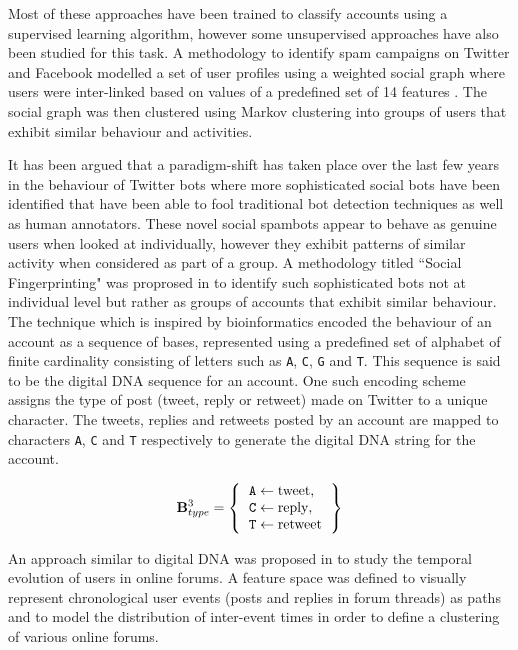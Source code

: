 \documentclass{llncs}
\begin{document}
Most of these approaches have been trained to classify accounts using a supervised learning algorithm, however some unsupervised approaches have also been studied for this task. A methodology to identify spam campaigns on Twitter and Facebook modelled a set of user profiles using a weighted social graph where users were inter-linked based on values of a predefined set of 14 features \cite{ahmed2013generic}. The social graph was then clustered using Markov clustering into groups of users that exhibit similar behaviour and activities.

It has been argued that a paradigm-shift \cite{Cresci:2017:PSS:3041021.3055135} has taken place over the last few years in the behaviour of Twitter bots where more sophisticated social bots have been identified that have been able to fool traditional bot detection techniques as well as human annotators. These novel social spambots appear to behave as genuine users when looked at individually, however they exhibit patterns of similar activity when considered as part of a group. A methodology titled ``Social Fingerprinting" was proprosed in \cite{7876716} to identify such sophisticated bots not at individual level but rather as groups of accounts that exhibit similar behaviour. The technique which is inspired by bioinformatics encoded the behaviour of an account as a sequence of bases, represented using a predefined set of alphabet of finite cardinality consisting of letters such as \texttt{A}, \texttt{C}, \texttt{G} and \texttt{T}. This sequence is said to be the digital DNA sequence for an account. One such encoding scheme assigns the type of post (tweet, reply or retweet) made on Twitter to a unique character. The tweets, replies and retweets posted by an account are mapped to characters \texttt{A}, \texttt{C} and \texttt{T} respectively to generate the digital DNA string for the account. 

\[ 
\mathbf{B}^{3}_{type} = 
\left \{
  \begin{tabular}{l}
  $\texttt{A} \leftarrow \textrm{tweet}, $ \\
  $\texttt{C} \leftarrow \textrm{reply}, $ \\
  $\texttt{T} \leftarrow \textrm{retweet} $
  \end{tabular}
\right \}
\]

An approach similar to digital DNA was proposed in \cite{Kan2013} to study the temporal evolution of users in online forums. A feature space was defined to visually represent chronological user events (posts and replies in forum threads) as paths and to model the distribution of inter-event times in order to define a clustering of various online forums. 
\end{document}
